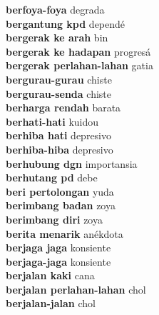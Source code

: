 \textbf{ berfoya-foya  } degrada \\
\textbf{ bergantung kpd  } dependé \\
\textbf{ bergerak ke arah  } bin \\
\textbf{ bergerak ke hadapan  } progresá \\
\textbf{ bergerak perlahan-lahan  } gatia \\
\textbf{ bergurau-gurau  } chiste \\
\textbf{ bergurau-senda  } chiste \\
\textbf{ berharga rendah  } barata \\
\textbf{ berhati-hati  } kuidou \\
\textbf{ berhiba hati  } depresivo \\
\textbf{ berhiba-hiba  } depresivo \\
\textbf{ berhubung dgn  } importansia \\
\textbf{ berhutang pd  } debe \\
\textbf{ beri pertolongan  } yuda \\
\textbf{ berimbang badan  } zoya \\
\textbf{ berimbang diri  } zoya \\
\textbf{ berita menarik  } anékdota \\
\textbf{ berjaga jaga  } konsiente \\
\textbf{ berjaga-jaga  } konsiente \\
\textbf{ berjalan kaki  } cana \\
\textbf{ berjalan perlahan-lahan  } chol \\
\textbf{ berjalan-jalan  } chol \\
